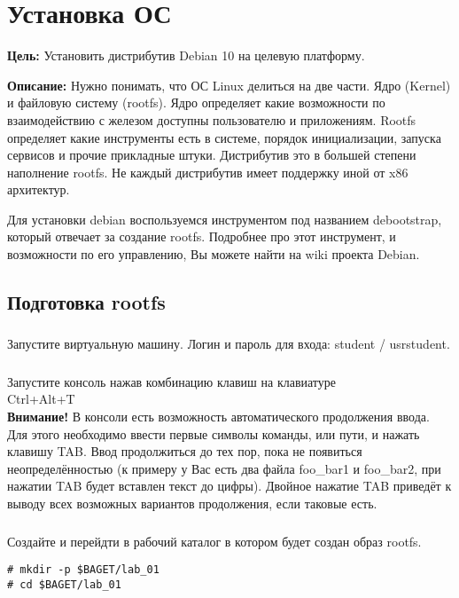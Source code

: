 \chapter{Установка ОС}
\textbf{Цель:} Установить дистрибутив Debian 10 на целевую платформу.

\vspace{5mm}
\textbf{Описание:} Нужно понимать, что ОС Linux делиться на две части. Ядро (Kernel) и файловую систему (rootfs). Ядро определяет какие возможности по взаимодействию с железом доступны пользователю и приложениям. Rootfs определяет какие инструменты есть в системе, порядок инициализации, запуска сервисов и прочие прикладные штуки. Дистрибутив это в большей степени наполнение rootfs. Не каждый дистрибутив имеет поддержку иной от x86 архитектур.

Для установки debian воспользуемся инструментом под названием debootstrap, который отвечает за создание rootfs. Подробнее про этот инструмент, и возможности по его управлению, Вы можете найти на wiki проекта Debian.


\section{Подготовка rootfs}

\subsection{}Запустите виртуальную машину. Логин и пароль для входа: student / usrstudent.

\subsection{} Запустите консоль нажав комбинацию клавиш на клавиатуре \\Ctrl+Alt+T\\

\textbf{Внимание!} В консоли есть возможность автоматического продолжения ввода. Для этого необходимо ввести первые символы команды, или пути, и нажать клавишу TAB. Ввод продолжиться до тех пор, пока не появиться неопределённостью (к примеру у Вас есть два файла foo\_bar1 и foo\_bar2, при нажатии TAB будет вставлен текст до цифры). Двойное нажатие TAB приведёт к выводу всех возможных вариантов продолжения, если таковые есть.

\subsection{}Создайте и перейдти в рабочий каталог в котором будет создан образ rootfs.
\begin{lstlisting}[style=bash]
# mkdir -p $BAGET/lab_01
# cd $BAGET/lab_01 
\end{lstlisting}

